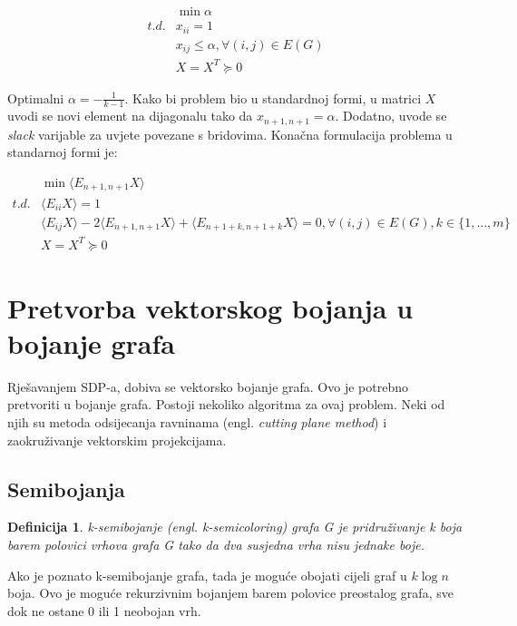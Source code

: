 \documentclass[diplomskirad]{fer}
\newtheorem{definicija}{Definicija}
\begin{document}
\begin{equation}
  \begin{split}
    & \min \alpha \\
    t.d. & x_{ii} = 1 \\
         & x_{ij} \leq \alpha, \forall (i,j) \in E(G) \\
         & X=X^T \succeq 0 
  \end{split}
\end{equation}

Optimalni $\alpha = -\frac{1}{k-1}$. Kako bi problem bio u standardnoj formi, u matrici $X$ uvodi se novi element na dijagonalu tako da
$x_{n+1,n+1} = \alpha$. Dodatno, uvode se \textit{slack} varijable za uvjete povezane s bridovima. Konačna formulacija problema u standarnoj formi je: 


\begin{equation} \label{sdpbojanje}
  \begin{split}
    & \min \langle E_{n+1,n+1}X \rangle \\
    t.d. & \langle E_{ii}X \rangle = 1 \\
         & \langle E_{ij}X \rangle - 2 \langle E_{n+1,n+1}X \rangle + \langle E_{n+1+k,n+1+k}X \rangle = 0, \forall (i,j) \in E(G), k \in \{1,\dots,m\} \\
         & X=X^T \succeq 0 
  \end{split}
\end{equation}

\section{Pretvorba vektorskog bojanja u bojanje grafa}
Rješavanjem SDP-a, dobiva se vektorsko bojanje grafa. Ovo je potrebno pretvoriti u bojanje grafa. Postoji nekoliko algoritma za ovaj problem. Neki od njih su metoda odsijecanja ravninama 
(engl. \textit{cutting plane method}) i zaokruživanje vektorskim projekcijama.

\subsection{Semibojanja}
\begin{definicija}
  k-semibojanje (engl. \textit{k-semicoloring}) grafa G je pridruživanje k boja barem polovici vrhova grafa G tako da dva susjedna vrha nisu jednake boje. 
\end{definicija}

Ako je poznato k-semibojanje grafa, tada je moguće obojati cijeli graf u $k\log n$ boja. Ovo je moguće rekurzivnim bojanjem barem polovice preostalog grafa,
sve dok ne ostane 0 ili 1 neobojan vrh.
\end{document}
